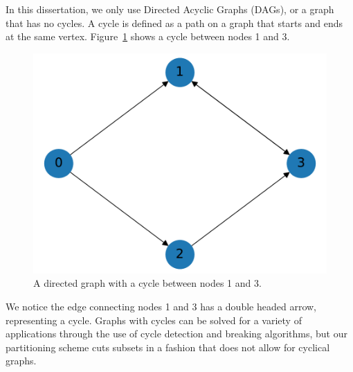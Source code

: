 In this dissertation, we only use Directed Acyclic Graphs (DAGs), or a graph that has no cycles.  A cycle is defined as a path on a graph that starts and ends at the same vertex. Figure~\ref{cycle_example} shows a cycle between nodes 1 and 3.
\begin{figure}[H]
\centering
\includegraphics[scale=0.5]{../../figures/cycle_example.pdf}
\caption{A directed graph with a cycle between nodes 1 and 3.}
\label{cycle_example}
\end{figure}
We notice the edge connecting nodes 1 and 3 has a double headed arrow, representing a cycle. Graphs with cycles can be solved for a variety of applications through the use of cycle detection and breaking algorithms, but our partitioning scheme cuts subsets in a fashion that does not  allow for cyclical graphs.

